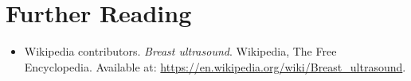 \section{Further Reading}
\begin{itemize}
  \item Wikipedia contributors. \textit{Breast ultrasound}. Wikipedia, The Free Encyclopedia. Available at: \url{https://en.wikipedia.org/wiki/Breast_ultrasound}.
\end{itemize}
